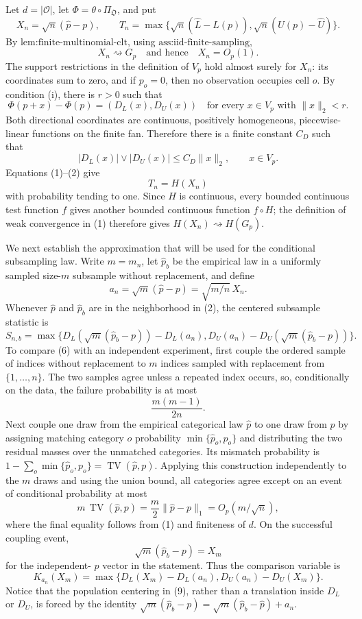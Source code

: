Let \(d=|\mathcal O|\), let \(\Phi=\theta\circ\Pi_{\mathfrak O}\), and put
\[
X_n=\sqrt n(\widehat p-p),\qquad
T_n=\max\{\sqrt n(\widehat L-L(p)),\sqrt n(U(p)-\widehat U)\}.
\]
By \(\text{lem:finite-multinomial-clt}\), using \(\text{ass:iid-finite-sampling}\),
\[
X_n\rightsquigarrow G_p
\quad\text{and hence}\quad X_n=O_p(1).
\tag{1}
\]
The support restrictions in the definition of \(V_p\) hold almost surely for \(X_n\): its coordinates sum to zero, and if \(p_o=0\), then no observation occupies cell \(o\).  By condition (i), there is \(r>0\) such that
\[
\Phi(p+x)-\Phi(p)=(D_L(x),D_U(x))
\quad\text{for every }x\in V_p\text{ with }\|x\|_2<r.
\tag{2}
\]
Both directional coordinates are continuous, positively homogeneous, piecewise-linear functions on the finite fan.  Therefore there is a finite constant \(C_D\) such that
\[
|D_L(x)|\vee |D_U(x)|\leq C_D\|x\|_2,
\qquad x\in V_p.
\tag{3}
\]
Equations (1)--(2) give
\[
T_n=H(X_n)
\tag{4}
\]
with probability tending to one.  Since \(H\) is continuous, every bounded continuous test function \(f\) gives another bounded continuous function \(f\circ H\); the definition of weak convergence in (1) therefore gives \(H(X_n)\rightsquigarrow H(G_p)\).

We next establish the approximation that will be used for the conditional subsampling law.  Write \(m=m_n\), let \(\widehat p_b\) be the empirical law in a uniformly sampled size-\(m\) subsample without replacement, and define
\[
a_n=\sqrt m(\widehat p-p)=\sqrt{m/n}\,X_n.
\tag{5}
\]
Whenever \(\widehat p\) and \(\widehat p_b\) are in the neighborhood in (2), the centered subsample statistic is
\[
S_{n,b}
=\max\{D_L(\sqrt m(\widehat p_b-p))-D_L(a_n),
D_U(a_n)-D_U(\sqrt m(\widehat p_b-p))\}.
\tag{6}
\]
To compare (6) with an independent experiment, first couple the ordered sample of indices without replacement to \(m\) indices sampled with replacement from \(\{1,\ldots,n\}\).  The two samples agree unless a repeated index occurs, so, conditionally on the data, the failure probability is at most
\[
\frac{m(m-1)}{2n}.
\tag{7}
\]
Next couple one draw from the empirical categorical law \(\widehat p\) to one draw from \(p\) by assigning matching category \(o\) probability \(\min\{\widehat p_o,p_o\}\) and distributing the two residual masses over the unmatched categories.  Its mismatch probability is \(1-\sum_o\min\{\widehat p_o,p_o\}=\operatorname{TV}(\widehat p,p)\).  Applying this construction independently to the \(m\) draws and using the union bound, all categories agree except on an event of conditional probability at most
\[
m\,\operatorname{TV}(\widehat p,p)
=\frac m2\|\widehat p-p\|_1
=O_p(m/\sqrt n),
\tag{8}
\]
where the final equality follows from (1) and finiteness of \(d\).  On the successful coupling event,
\[
\sqrt m(\widehat p_b-p)=X_m
\]
for the independent-
\(p\) vector in the statement.  Thus the comparison variable is
\[
K_{a_n}(X_m)
=\max\{D_L(X_m)-D_L(a_n),D_U(a_n)-D_U(X_m)\}.
\tag{9}
\]
Notice that the population centering in (9), rather than a translation inside \(D_L\) or \(D_U\), is forced by the identity \(\sqrt m(\widehat p_b-p)=\sqrt m(\widehat p_b-\widehat p)+a_n\).


